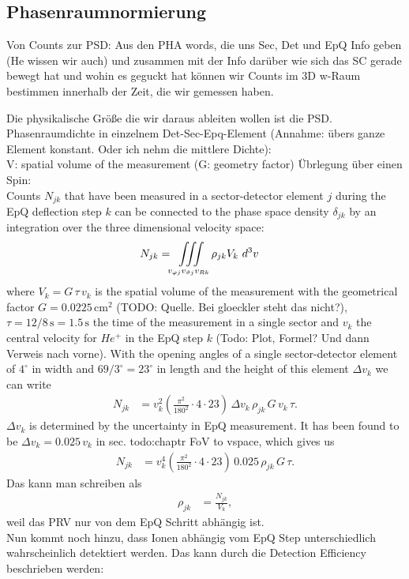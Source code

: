 %
\subsection{Phasenraumnormierung}
Von Counts zur PSD:
Aus den PHA words, die uns Sec, Det und EpQ Info geben (He wissen wir auch) und zusammen mit der Info darüber wie sich das SC gerade bewegt hat und wohin es geguckt hat können wir Counts im 3D w-Raum bestimmen innerhalb der Zeit, die wir gemessen haben.

Die physikalische Größe die wir daraus ableiten wollen ist die PSD.\\

Phasenraumdichte in einzelnem Det-Sec-Epq-Element (Annahme: übers ganze Element konstant. Oder ich nehm die mittlere Dichte):\\
V: spatial volume of the measurement (G: geometry factor)
Übrlegung über einen Spin: \\
Counts $N_{jk}$ that have been measured in a sector-detector element $j$ during the EpQ deflection step $k$ can be connected to the phase space density $\delta_{jk}$ by an integration over the three dimensional velocity space:
\begin{align*}
N_{jk} &= \iiint\displaylimits_{v_{\varphi j}v_{\vartheta j}v_{R k}} \rho_{jk}	V_k	\,\,	d^3v
\end{align*}
where $V_k = G \, \tau \, v_k$ is the spatial volume of the measurement with the geometrical factor $G = 0.0225 \,\mathrm{cm^2}$ (TODO: Quelle. Bei gloeckler steht das nicht?), $\tau = 12/8\,\mathrm{s} = 1.5\,\mathrm{s}$ the time of the measurement in a single sector and $v_k$ the central velocity for $He^{+}$ in the EpQ step $k$ (Todo: Plot, Formel? Und dann Verweis nach vorne).
With the opening angles of a single sector-detector element of $4^\circ$ in width and $69/3^\circ = 23^\circ$ in length and the height of this element $\Delta v_k$ we can write
\begin{align*}
N_{jk} &= v^2_k \left(\frac{\pi^2}{180^2}\cdot4 \cdot 23\right) \, \Delta v_k \, \rho_{jk} \,	G \, v_k \, \tau.
\end{align*}
$\Delta v_k$ is determined by the uncertainty in EpQ measurement. It has been found to be $\Delta v_k = 0.025 \, v_k$ in sec. todo:chaptr FoV to vspace, which gives us
\begin{align*}
N_{jk} &= v^4_k \left(\frac{\pi^2}{180^2}\cdot4 \cdot 23\right) \, 0.025\, \rho_{jk} \, G  \, \tau.
\end{align*}
Das kann man schreiben als 
\begin{align*}
\rho_{jk} &= \frac{N_{jk}}{V_{k}},
\end{align*}
weil das PRV nur von dem EpQ Schritt abhängig ist.\\
Nun kommt noch hinzu, dass Ionen abhängig vom EpQ Step unterschiedlich wahrscheinlich detektiert werden.
Das kann durch die Detection Efficiency beschrieben werden:

